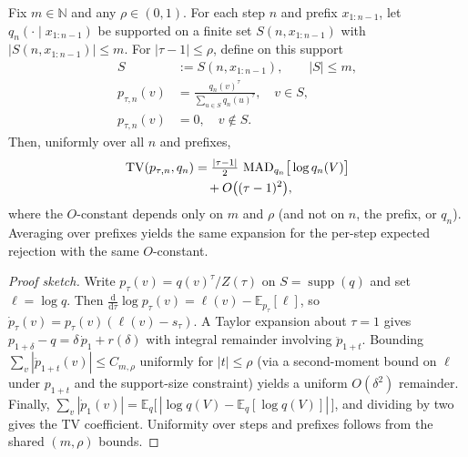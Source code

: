 \begin{theorem}\label{thm:local-temp-sensitivity}\sloppy
Fix $m\in\mathbb{N}$ and any $\rho\in(0,1)$. For each step $n$ and prefix $x_{1:n-1}$, let $q_n(\cdot\mid x_{1:n-1})$ be supported on a finite set $S(n,x_{1:n-1})$ with $|S(n,x_{1:n-1})|\le m$. For $|\tau-1|\le\rho$, define on this support
\[
\begin{aligned}
S&:=S(n,x_{1:n-1}),\qquad |S|\le m,\\
p_{\tau,n}(v)&=\frac{q_n(v)^{\tau}}{\sum_{u\in S} q_n(u)^{\tau}},\quad v\in S,\\
p_{\tau,n}(v)&=0,\quad v\notin S.
\end{aligned}
\]
Then, uniformly over all $n$ and prefixes,
\[
\begin{aligned}
\operatorname{TV}(p_{\tau,n},q_n)
&=\tfrac{|\tau-1|}{2}\,\operatorname{MAD}_{q_n}\!\big[\log q_n(V)\big]\\
&\quad+O\big((\tau-1)^2\big),
\end{aligned}
\]
where the $O$-constant depends only on $m$ and $\rho$ (and not on $n$, the prefix, or $q_n$). Averaging over prefixes yields the same expansion for the per-step expected rejection with the same $O$-constant.
\end{theorem}

\begin{proof}[Proof sketch]
Write $p_\tau(v)=q(v)^\tau/Z(\tau)$ on $S=\operatorname{supp}(q)$ and set $\ell=\log q$. Then $\tfrac{\mathrm d}{\mathrm d\tau}\log p_\tau(v)=\ell(v)-\mathbb E_{p_\tau}[\ell]$, so $\dot p_\tau(v)=p_\tau(v)(\ell(v)-s_\tau)$. A Taylor expansion about $\tau=1$ gives $p_{1+\delta}-q=\delta\,\dot p_1+r(\delta)$ with integral remainder involving $\ddot p_{1+t}$. Bounding $\sum_v|\ddot p_{1+t}(v)|\le C_{m,\rho}$ uniformly for $|t|\le\rho$ (via a second-moment bound on $\ell$ under $p_{1+t}$ and the support-size constraint) yields a uniform $O(\delta^2)$ remainder. Finally, $\sum_v|\dot p_1(v)|=\mathbb E_q\big[\,|\log q(V)-\mathbb E_q[\log q(V)]|\,\big]$, and dividing by two gives the TV coefficient. Uniformity over steps and prefixes follows from the shared $(m,\rho)$ bounds.\qedhere
\end{proof}
